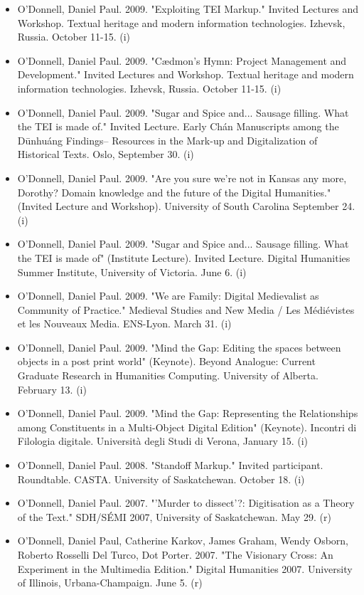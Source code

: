 \documentclass[12pt]{article}
\begin{document}
\begin{itemize}
  \item O'Donnell, Daniel Paul. 2009. "Exploiting TEI Markup." Invited Lectures and Workshop. Textual heritage and modern information technologies. Izhevsk, Russia. October 11-15. (i)
  \item O'Donnell, Daniel Paul. 2009. "Cædmon's Hymn: Project Management and Development." Invited Lectures and Workshop. Textual heritage and modern information technologies. Izhevsk, Russia. October 11-15. (i)
  \item O'Donnell, Daniel Paul. 2009. "Sugar and Spice and... Sausage filling. What the TEI is made of." Invited Lecture.     Early Chán Manuscripts among the Dūnhuáng Findings– Resources in the Mark-up and Digitalization of Historical Texts. Oslo, September 30. (i)
  \item O'Donnell, Daniel Paul. 2009. "Are you sure we're not in Kansas any more, Dorothy? Domain knowledge and the future of the Digital Humanities." (Invited Lecture and Workshop). University of South Carolina September 24. (i)
  \item O'Donnell, Daniel Paul. 2009. "Sugar and Spice and... Sausage filling. What the TEI is made of" (Institute Lecture). Invited Lecture. Digital Humanities Summer Institute, University of Victoria. June 6. (i)
  \item O'Donnell, Daniel Paul. 2009. "We are Family: Digital Medievalist as Community of Practice." Medieval Studies and New Media / Les Médiévistes et les Nouveaux Media. ENS-Lyon. March 31. (i)
  \item O'Donnell, Daniel Paul. 2009. "Mind the Gap: Editing the spaces between objects in a post print world" (Keynote). Beyond Analogue: Current Graduate Research in Humanities Computing. University of Alberta. February 13. (i)
  \item O'Donnell, Daniel Paul. 2009. "Mind the Gap: Representing the Relationships among Constituents in a Multi-Object Digital Edition" (Keynote). Incontri di Filologia digitale. Università degli Studi di Verona, January 15. (i)
  \item O'Donnell, Daniel Paul. 2008. "Standoff Markup." Invited participant. Roundtable. CASTA. University of Saskatchewan. October 18. (i)
  \item O'Donnell, Daniel Paul. 2007. "'Murder to dissect'?: Digitisation as a Theory of the Text." SDH/SÉMI 2007, University of Saskatchewan. May 29. (r)
  \item O'Donnell, Daniel Paul, Catherine Karkov, James Graham, Wendy Osborn, Roberto Rosselli Del Turco, Dot Porter. 2007. "The Visionary Cross: An Experiment in the Multimedia Edition." Digital Humanities 2007. University of Illinois, Urbana-Champaign. June 5. (r)

\end{itemize}
\end{document}
